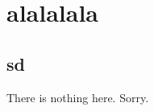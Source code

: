 % 
%





\setlength{\parindent}{0pt}

\usepackage{epigraph}
\usepackage{tocloft}




\chapter{alalalala}
\section{sd}
\label{a}
There is nothing here. Sorry. 

